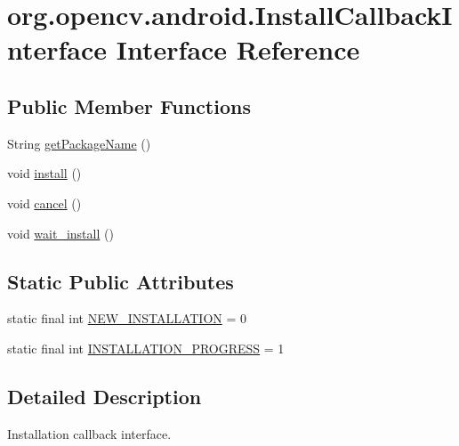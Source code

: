 \hypertarget{interfaceorg_1_1opencv_1_1android_1_1_install_callback_interface}{}\section{org.\+opencv.\+android.\+Install\+Callback\+Interface Interface Reference}
\label{interfaceorg_1_1opencv_1_1android_1_1_install_callback_interface}
\subsection*{Public Member Functions}
\begin{DoxyCompactItemize}
\item 
String \mbox{\hyperlink{interfaceorg_1_1opencv_1_1android_1_1_install_callback_interface_abed262bf1da0198af872b7ca7bba4045}{get\+Package\+Name}} ()
\item 
void \mbox{\hyperlink{interfaceorg_1_1opencv_1_1android_1_1_install_callback_interface_a28b70ef6e9437493ac640372939fab1b}{install}} ()
\item 
void \mbox{\hyperlink{interfaceorg_1_1opencv_1_1android_1_1_install_callback_interface_a30287ea96247aedda19a431ac159c420}{cancel}} ()
\item 
void \mbox{\hyperlink{interfaceorg_1_1opencv_1_1android_1_1_install_callback_interface_a4aa5d4a790e2439da16e91092c2dd4b4}{wait\+\_\+install}} ()
\end{DoxyCompactItemize}
\subsection*{Static Public Attributes}
\begin{DoxyCompactItemize}
\item 
static final int \mbox{\hyperlink{interfaceorg_1_1opencv_1_1android_1_1_install_callback_interface_ad04e1ef7ec6ca29f561c40cc7aa1ace7}{N\+E\+W\+\_\+\+I\+N\+S\+T\+A\+L\+L\+A\+T\+I\+ON}} = 0
\item 
static final int \mbox{\hyperlink{interfaceorg_1_1opencv_1_1android_1_1_install_callback_interface_a8269eb8d4f021c551f010b33c58d6e5c}{I\+N\+S\+T\+A\+L\+L\+A\+T\+I\+O\+N\+\_\+\+P\+R\+O\+G\+R\+E\+SS}} = 1
\end{DoxyCompactItemize}


\subsection{Detailed Description}
Installation callback interface. 

